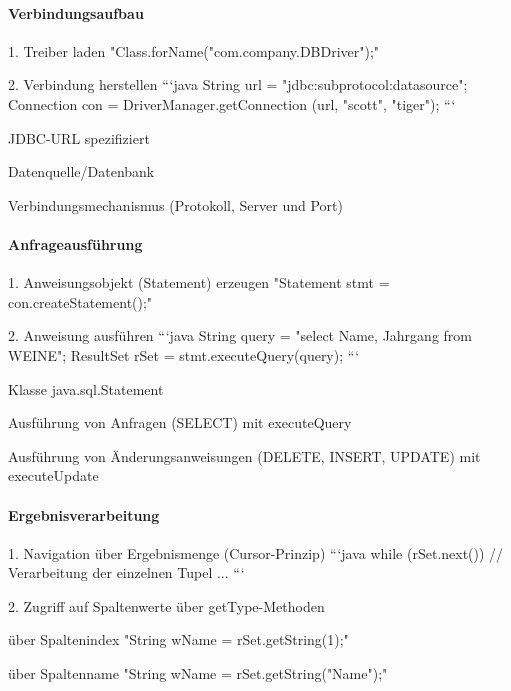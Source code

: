 \documentclass[a4paper]{article}
\begin{document}
\begin{multicols}{3}
    \paragraph{Verbindungsaufbau}
    1. Treiber laden "Class.forName("com.company.DBDriver");"

    2. Verbindung herstellen
    ```java
    String url = "jdbc:subprotocol:datasource";
    Connection con = DriverManager.getConnection
    (url, "scott", "tiger");
    ```

    JDBC-URL spezifiziert
    \begin{itemize*}
        \item Datenquelle/Datenbank
        \item Verbindungsmechanismus (Protokoll, Server und Port)
    \end{itemize*}

    \paragraph{Anfrageausführung}
    1. Anweisungsobjekt (Statement) erzeugen "Statement stmt = con.createStatement();"

    2. Anweisung ausführen
    ```java
    String query = "select Name, Jahrgang from WEINE";
    ResultSet rSet = stmt.executeQuery(query);
    ```

    Klasse java.sql.Statement
    \begin{itemize*}
        \item Ausführung von Anfragen (SELECT) mit executeQuery
        \item Ausführung von Änderungsanweisungen (DELETE, INSERT, UPDATE) mit executeUpdate
    \end{itemize*}

    \paragraph{Ergebnisverarbeitung}
    1. Navigation über Ergebnismenge (Cursor-Prinzip)
    ```java
    while (rSet.next()) {
            // Verarbeitung der einzelnen Tupel
            ...
        }
    ```

    2. Zugriff auf Spaltenwerte über getType-Methoden
    \begin{itemize*}
        \item über Spaltenindex "String wName = rSet.getString(1);"
        \item über Spaltenname "String wName = rSet.getString("Name");"
    \end{itemize*}


\end{multicols}
\end{document}
